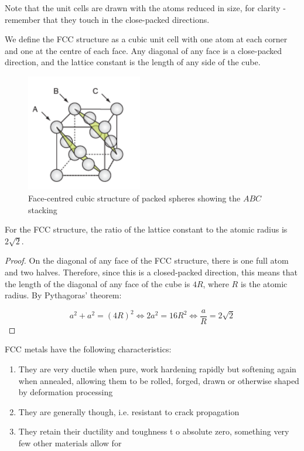 \documentclass{article}
\begin{document}
Note that the unit cells are drawn with the atoms reduced in size, for clarity - remember that they touch in the close-packed directions.

\begin{definition}
    We define the FCC structure as a cubic unit cell with one atom at each corner and one at the centre of each face. Any diagonal of any face is a close-packed direction, and the lattice constant is the length of any side of the cube.
\end{definition}

\begin{figure}[h]
    \centering
    \includegraphics[width = 0.45\textwidth]{images/mat4.png}
    \caption{Face-centred cubic structure of packed spheres showing the $ABC$ stacking}
    \label{fig:enter-label}
\end{figure}

\begin{proposition}
    For the FCC structure, the ratio of the lattice constant to the atomic radius is $2\sqrt{2}$.
\end{proposition}

\begin{proof}
    On the diagonal of any face of the FCC structure, there is one full atom and two halves. Therefore, since this is a closed-packed direction, this means that the length of the diagonal of any face of the cube is $4R$, where $R$ is the atomic radius. By Pythagoras' theorem:

    \[ a^2 + a^2 = (4R)^2 \iff 2a^2 = 16R^2 \iff \frac{a}{R} = 2\sqrt{2} \]
\end{proof}

FCC metals have the following characteristics:

\begin{enumerate}
    \item They are very ductile when pure, work hardening rapidly but softening again when annealed, allowing them to be rolled, forged, drawn or otherwise shaped by deformation processing
    \item They are generally though, i.e. resistant to crack propagation
    \item They retain their ductility and toughness t o absolute zero, something very few other materials allow for
\end{enumerate}
\end{document}
